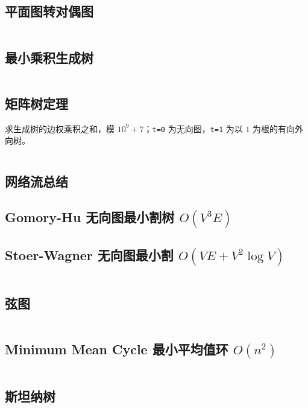 				\subsection{平面图转对偶图}
					\inputminted{cpp}{sections/GraphTheory/assets/graph/平面图转对偶图.cpp}
				\subsection{最小乘积生成树}
					\inputminted{cpp}{sections/GraphTheory/assets/graph/最小乘积生成树.cpp}
				\subsection{矩阵树定理}
					求生成树的边权乘积之和，模 $10^9+7$；\texttt{t=0} 为无向图，\texttt{t=1} 为以 $1$ 为根的有向外向树。
					\inputminted{cpp}{sections/GraphTheory/assets/graph/矩阵树定理.cpp}
				\subsection{网络流总结}
					
				\subsection{Gomory-Hu 无向图最小割树 \texorpdfstring{$O(V ^ 3 E)$}{O(V³ E)}}
					
				\subsection{Stoer-Wagner 无向图最小割 \texorpdfstring{$O(VE + V ^ 2 \log V)$}{O(VE + V² log V)}}
					\inputminted{cpp}{sections/GraphTheory/assets/graph/Stoer-Wagner.cpp}
				\subsection{弦图}
					
					\inputminted{cpp}{sections/GraphTheory/assets/graph/弦图.cpp}
				\subsection{Minimum Mean Cycle 最小平均值环 \texorpdfstring{$O(n^2)$}{O(n²)}}
					\inputminted{cpp}{sections/GraphTheory/assets/graph/MeanCycle.cpp}
				\subsection{斯坦纳树}
					\inputminted{cpp}{sections/GraphTheory/assets/graph/斯坦纳树.cpp}
